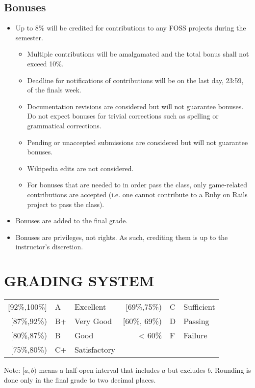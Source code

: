 \documentclass[10pt]{article}
\begin{document}
\subsection{Bonuses}
\begin{itemize}[noitemsep]
\item Up to 8\% will be credited for contributions to any FOSS projects during the semester.
	\begin{itemize}[noitemsep]
		\item Multiple contributions will be amalgamated and the total bonus shall not exceed 10\%.
		\item Deadline for notifications of contributions will be on the last day, 23:59, of the finals week.
		\item Documentation revisions are considered but will not guarantee bonuses. Do not expect bonuses for trivial corrections such as spelling or grammatical corrections.
		\item Pending or unaccepted submissions are considered but will not guarantee bonuses.
		\item Wikipedia edits are not considered.
		\item For bonuses that are needed to in order pass the class, only game-related contributions are accepted (i.e. one cannot contribute to a Ruby on Rails project to pass the class).
	\end{itemize}
\item Bonuses are added to the final grade.
\item Bonuses are privileges, not rights. As such, crediting them is up to the instructor's discretion.
\end{itemize}

\section{GRADING SYSTEM}
\begin{center}
	\begin{tabular}{rll|rll}
	{[}92\%,100\%] & A & Excellent & 	{[}69\%,75\%) & C & Sufficient\\
	{[}87\%,92\%) & B+ & Very Good &			{[}60\%, 69\%) & D & Passing\\
	{[}80\%,87\%) & B & Good & 			< 60\% & F & Failure\\
	{[}75\%,80\%) & C+ & Satisfactory \\
	\end{tabular}
\end{center}
Note: $[a,b)$ means a half-open interval that includes $a$ but excludes $b$. Rounding is done only in the final grade to two decimal places.
\end{document}

